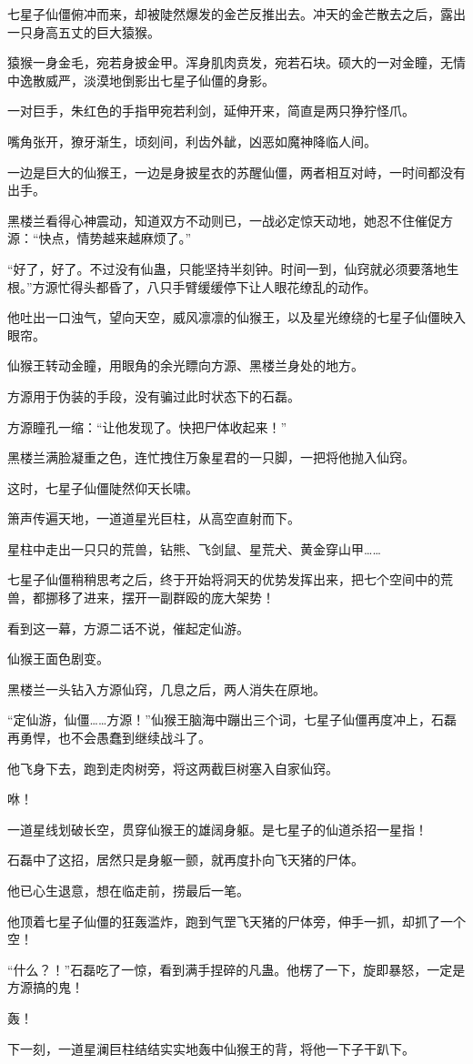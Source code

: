 \begin{this_body}
七星子仙僵俯冲而来，却被陡然爆发的金芒反推出去。冲天的金芒散去之后，露出一只身高五丈的巨大猿猴。

猿猴一身金毛，宛若身披金甲。浑身肌肉贲发，宛若石块。硕大的一对金瞳，无情中逸散威严，淡漠地倒影出七星子仙僵的身影。

一对巨手，朱红色的手指甲宛若利剑，延伸开来，简直是两只狰狞怪爪。

嘴角张开，獠牙渐生，顷刻间，利齿外龇，凶恶如魔神降临人间。

一边是巨大的仙猴王，一边是身披星衣的苏醒仙僵，两者相互对峙，一时间都没有出手。

黑楼兰看得心神震动，知道双方不动则已，一战必定惊天动地，她忍不住催促方源：“快点，情势越来越麻烦了。”

“好了，好了。不过没有仙蛊，只能坚持半刻钟。时间一到，仙窍就必须要落地生根。”方源忙得头都昏了，八只手臂缓缓停下让人眼花缭乱的动作。

他吐出一口浊气，望向天空，威风凛凛的仙猴王，以及星光缭绕的七星子仙僵映入眼帘。

仙猴王转动金瞳，用眼角的余光瞟向方源、黑楼兰身处的地方。

方源用于伪装的手段，没有骗过此时状态下的石磊。

方源瞳孔一缩：“让他发现了。快把尸体收起来！”

黑楼兰满脸凝重之色，连忙拽住万象星君的一只脚，一把将他抛入仙窍。

这时，七星子仙僵陡然仰天长啸。

箫声传遍天地，一道道星光巨柱，从高空直射而下。

星柱中走出一只只的荒兽，钻熊、飞剑鼠、星荒犬、黄金穿山甲……

七星子仙僵稍稍思考之后，终于开始将洞天的优势发挥出来，把七个空间中的荒兽，都挪移了进来，摆开一副群殴的庞大架势！

看到这一幕，方源二话不说，催起定仙游。

仙猴王面色剧变。

黑楼兰一头钻入方源仙窍，几息之后，两人消失在原地。

“定仙游，仙僵……方源！”仙猴王脑海中蹦出三个词，七星子仙僵再度冲上，石磊再勇悍，也不会愚蠢到继续战斗了。

他飞身下去，跑到走肉树旁，将这两截巨树塞入自家仙窍。

咻！

一道星线划破长空，贯穿仙猴王的雄阔身躯。是七星子的仙道杀招一星指！

石磊中了这招，居然只是身躯一颤，就再度扑向飞天猪的尸体。

他已心生退意，想在临走前，捞最后一笔。

他顶着七星子仙僵的狂轰滥炸，跑到气罡飞天猪的尸体旁，伸手一抓，却抓了一个空！

“什么？！”石磊吃了一惊，看到满手捏碎的凡蛊。他楞了一下，旋即暴怒，一定是方源搞的鬼！

轰！

下一刻，一道星澜巨柱结结实实地轰中仙猴王的背，将他一下子干趴下。

\end{this_body}

